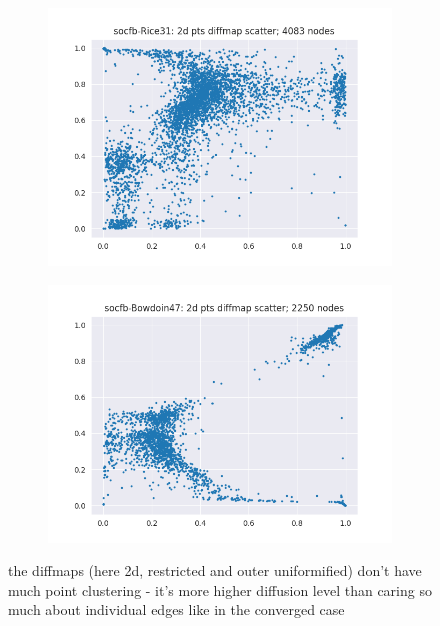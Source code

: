 \begin{figure}
  \begin{subfigure}{0.47\textwidth}
    \centering
    \includegraphics[width=\linewidth]{figures/socfb-Rice31_2ddiffmap_restrict_scatter.png}
  \end{subfigure}
  \hfill
  \begin{subfigure}{0.47\textwidth}
    \centering
    \includegraphics[width=\linewidth]{figures/socfb-Bowdoin47_2ddiffmap_restrict_scatter.png}
  \end{subfigure}


  \caption{the diffmaps (here 2d, restricted and outer uniformified) don't have much point clustering - it's more higher diffusion level than caring so much about individual edges like in the converged case}
  \label{fig:uniformifed_vs_restricted_rescaling}
\end{figure}



